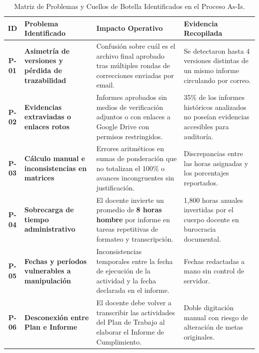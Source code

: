 \documentclass[12pt,a4paper]{article}
\begin{document}
\begin{table}[htbp]
\centering
\small
\renewcommand{\arraystretch}{1.2}
\begin{tabularx}{\textwidth}{|c|>{\raggedright\arraybackslash\bfseries}m{3.5cm}|X|X|}
\hline
\rowcolor{tableheader}
\textbf{ID} & \textbf{Problema Identificado} & \textbf{Impacto Operativo} & \textbf{Evidencia Recopilada} \\
\hline
\textbf{P-01} & Asimetría de versiones y pérdida de trazabilidad & Confusión sobre cuál es el archivo final aprobado tras múltiples rondas de correcciones enviadas por email. & Se detectaron hasta 4 versiones distintas de un mismo informe circulando por correo. \\
\hline
\textbf{P-02} & Evidencias extraviadas o enlaces rotos & Informes aprobados sin medios de verificación adjuntos o con enlaces a Google Drive con permisos restringidos. & 35\% de los informes históricos analizados no poseían evidencias accesibles para auditoría. \\
\hline
\textbf{P-03} & Cálculo manual e inconsistencias en matrices & Errores aritméticos en sumas de ponderación que no totalizan el 100\% o avances incongruentes sin justificación. & Discrepancias entre las horas asignadas y los porcentajes reportados. \\
\hline
\textbf{P-04} & Sobrecarga de tiempo administrativo & El docente invierte un promedio de \textbf{8 horas hombre} por informe en tareas repetitivas de formateo y transcripción. & 1,800 horas anuales invertidas por el cuerpo docente en burocracia documental. \\
\hline
\textbf{P-05} & Fechas y períodos vulnerables a manipulación & Inconsistencias temporales entre la fecha de ejecución de la actividad y la fecha declarada en el informe. & Fechas redactadas a mano sin control de servidor. \\
\hline
\textbf{P-06} & Desconexión entre Plan e Informe & El docente debe volver a transcribir las actividades del Plan de Trabajo al elaborar el Informe de Cumplimiento. & Doble digitación manual con riesgo de alteración de metas originales. \\
\hline
\end{tabularx}
\caption{Matriz de Problemas y Cuellos de Botella Identificados en el Proceso As-Is.}
\label{tab:problemas_asis}
\end{table}
\end{document}
